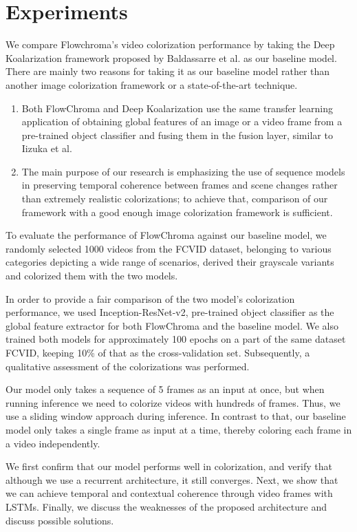 \documentclass[10pt,twocolumn,letterpaper]{article}
\begin{document}
\section{Experiments}
We compare Flowchroma’s video colorization performance by taking the Deep Koalarization framework proposed by Baldassarre et al. as our baseline model. There are mainly two reasons for taking it as our baseline model rather than another image colorization framework or a state-of-the-art technique.
\begin{enumerate}
\item Both FlowChroma and Deep Koalarization use the same transfer learning application of obtaining global features of an image or a video frame from a pre-trained object classifier and fusing them in the fusion layer, similar to Iizuka et al. 
\item The main purpose of our research is emphasizing the use of sequence models in preserving temporal coherence between frames and scene changes rather than extremely realistic colorizations; to achieve that, comparison of our framework with a good enough image colorization framework is sufficient.
\end{enumerate}

To evaluate the performance of FlowChroma against our baseline model, we randomly selected 1000 videos from the FCVID dataset, belonging to various categories depicting a wide range of scenarios, derived their grayscale variants and colorized them with the two models.

In order to provide a fair comparison of the two model’s colorization performance, we used Inception-ResNet-v2, pre-trained object classifier as the global feature extractor for both FlowChroma and the baseline model. We also trained both models for approximately 100 epochs on a part of the same dataset FCVID, keeping 10\% of that as the cross-validation set. Subsequently, a qualitative assessment of the colorizations was performed. 

Our model only takes a sequence of 5 frames as an input at once, but when running inference we need to colorize videos with hundreds of frames. Thus, we use a sliding window approach during inference. In contrast to that, our baseline model only takes a single frame as input at a time, thereby coloring each frame in a video independently.

We first confirm that our model performs well in colorization, and verify that although we use a recurrent architecture, it still converges. Next, we show that we can achieve temporal and contextual coherence through video frames with LSTMs. Finally, we discuss the weaknesses of the proposed architecture and discuss possible solutions.
\end{document}

